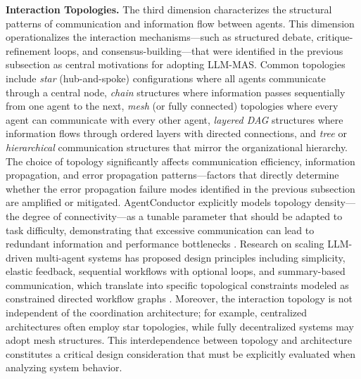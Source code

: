 \documentclass[11pt]{article}
\begin{document}
\textbf{Interaction Topologies.} The third dimension characterizes the structural patterns of communication and information flow between agents. This dimension operationalizes the interaction mechanisms---such as structured debate, critique-refinement loops, and consensus-building---that were identified in the previous subsection as central motivations for adopting LLM-MAS. Common topologies include \emph{star} (hub-and-spoke) configurations where all agents communicate through a central node, \emph{chain} structures where information passes sequentially from one agent to the next, \emph{mesh} (or fully connected) topologies where every agent can communicate with every other agent, \emph{layered DAG} structures where information flows through ordered layers with directed connections, and \emph{tree} or \emph{hierarchical} communication structures that mirror the organizational hierarchy. The choice of topology significantly affects communication efficiency, information propagation, and error propagation patterns---factors that directly determine whether the error propagation failure modes identified in the previous subsection are amplified or mitigated. AgentConductor explicitly models topology density---the degree of connectivity---as a tunable parameter that should be adapted to task difficulty, demonstrating that excessive communication can lead to redundant information and performance bottlenecks \cite{ref47}. Research on scaling LLM-driven multi-agent systems has proposed design principles including simplicity, elastic feedback, sequential workflows with optional loops, and summary-based communication, which translate into specific topological constraints modeled as constrained directed workflow graphs \cite{ref49}. Moreover, the interaction topology is not independent of the coordination architecture; for example, centralized architectures often employ star topologies, while fully decentralized systems may adopt mesh structures. This interdependence between topology and architecture constitutes a critical design consideration that must be explicitly evaluated when analyzing system behavior.
\end{document}

